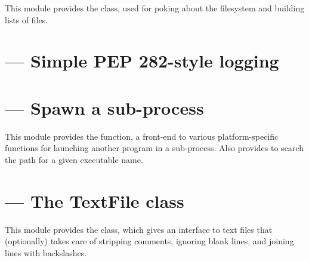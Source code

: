 \documentclass{manual}
\begin{document}
This module provides the  class, used for poking about
the filesystem and building lists of files.


\section{ --- Simple PEP 282-style logging}




\section{ --- Spawn a sub-process}

This module provides the  function, a front-end to 
various platform-specific functions for launching another program in a 
sub-process.
Also provides  to search the path for a given
executable name.





\section{ --- The TextFile class}

This module provides the  class, which gives an interface 
to text files that (optionally) takes care of stripping comments, ignoring 
blank lines, and joining lines with backslashes.
\end{document}
